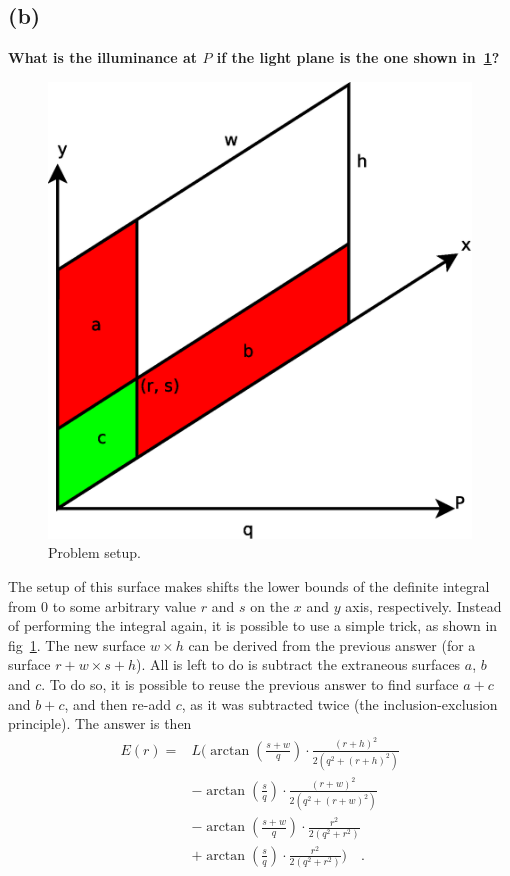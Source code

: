 \documentclass{report}
\begin{document}

\subsection{(b)}
\textbf{What is the illuminance at $P$ if the light plane is the one shown in~\ref{q2b:setup}?}

\begin{figure}
  \centering
  \includegraphics[width=0.33\linewidth]{q2b_setup.eps}
  \caption[Problem setup]
   {Problem setup.}
  \label{q2b:setup}
\end{figure}

The setup of this surface makes shifts the lower bounds of the definite integral from $0$ to some arbitrary value $r$ and $s$ on the $x$ and $y$ axis, respectively. Instead of performing the integral again, it is possible to use a simple trick, as shown in fig~\ref{q2b:setup}. The new surface $w \times h$ can be derived from the previous answer (for a surface $r+w \times s+h$). All is left to do is subtract the extraneous surfaces $a$, $b$ and $c$. To do so, it is possible to reuse the previous answer to find surface $a+c$ and $b+c$, and then re-add $c$, as it was subtracted twice (the inclusion-exclusion principle). The answer is then
\begin{align*}
E(r) =& L\biggl( \arctan\left(\frac{s+w}{q}\right) \cdot \frac{\left(r+h\right)^2}{2 \left(q^2 + \left(r+h\right)^2\right)} \\
&- \arctan\left(\frac{s}{q}\right) \cdot \frac{\left(r+w\right)^2}{2 \left(q^2 + \left(r+w\right)^2\right)} \\
&- \arctan\left(\frac{s+w}{q}\right) \cdot \frac{r^2}{2 \left(q^2 + r^2\right)} \\
&+ \arctan\left(\frac{s}{q}\right) \cdot \frac{r^2}{2 \left(q^2 + r^2\right)} \biggr)
\quad.
\end{align*}
\end{document}
